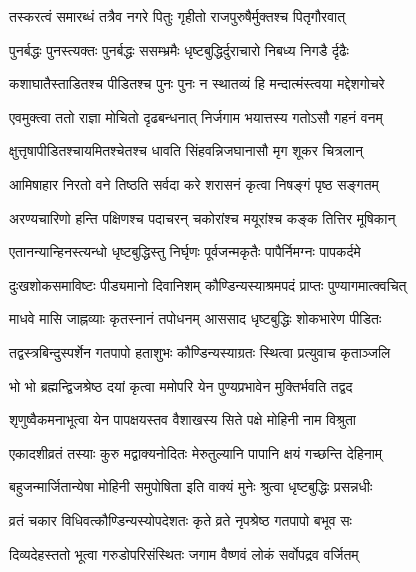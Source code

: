 \twolineshloka
{तस्करत्वं समारब्धं तत्रैव नगरे पितुः}
{गृहीतो राजपुरुषैर्मुक्तश्च पितृगौरवात्}%

\twolineshloka
{पुनर्बद्धः पुनस्त्यक्तः पुनर्बद्धः ससम्भ्रमैः}
{धृष्टबुद्धिर्दुराचारो निबध्य निगडै र्दृढैः}%

\twolineshloka
{कशाघातैस्ताडितश्च पीडितश्च पुनः पुनः}
{न स्थातव्यं हि मन्दात्मंस्त्वया मद्देशगोचरे}%

\twolineshloka
{एवमुक्त्वा ततो राज्ञा मोचितो दृढबन्धनात्}
{निर्जगाम भयात्तस्य गतोऽसौ गहनं वनम्}%

\twolineshloka
{क्षुत्तृषापीडितश्चायमितश्चेतश्च धावति}
{सिंहवन्निजघानासौ मृग शूकर चित्रलान्}%

\twolineshloka
{आमिषाहार निरतो वने तिष्ठति सर्वदा}
{करे शरासनं कृत्वा निषङ्गं पृष्ठ सङ्गतम्}%

\twolineshloka
{अरण्यचारिणो हन्ति पक्षिणश्च पदाचरन्}
{चकोरांश्च मयूरांश्च कङ्क तित्तिर मूषिकान्}%

\twolineshloka
{एतानन्यान्हिनस्त्यन्धो धृष्टबुद्धिस्तु निर्घृणः}
{पूर्वजन्मकृतैः पापैर्निमग्नः पापकर्दमे}%

\twolineshloka
{दुःखशोकसमाविष्टः पीड्यमानो दिवानिशम्}
{कौण्डिन्यस्याश्रमपदं प्राप्तः पुण्यागमात्क्वचित्}%

\twolineshloka
{माधवे मासि जाह्नव्याः कृतस्नानं तपोधनम्}
{आससाद धृष्टबुद्धिः शोकभारेण पीडितः}%

\twolineshloka
{तद्वस्त्रबिन्दुस्पर्शेन गतपापो हताशुभः}
{कौण्डिन्यस्याग्रतः स्थित्वा प्रत्युवाच कृताञ्जलि}%


\twolineshloka
{भो भो ब्रह्मन्द्विजश्रेष्ठ दयां कृत्वा ममोपरि}
{येन पुण्यप्रभावेन मुक्तिर्भवति तद्वद}%


\twolineshloka
{शृणुष्वैकमनाभूत्वा येन पापक्षयस्तव}
{वैशाखस्य सिते पक्षे मोहिनी नाम विश्रुता}%

\twolineshloka
{एकादशीव्रतं तस्याः कुरु मद्वाक्यनोदितः}
{मेरुतुल्यानि पापानि क्षयं गच्छन्ति देहिनाम्}%

\twolineshloka
{बहुजन्मार्जितान्येषा मोहिनी समुपोषिता}
{इति वाक्यं मुनेः श्रुत्वा धृष्टबुद्धिः प्रसन्नधीः}%

\twolineshloka
{व्रतं चकार विधिवत्कौण्डिन्यस्योपदेशतः}
{कृते व्रते नृपश्रेष्ठ गतपापो बभूव सः}%

\twolineshloka
{दिव्यदेहस्ततो भूत्वा गरुडोपरिसंस्थितः}
{जगाम वैष्णवं लोकं सर्वोपद्रव वर्जितम्}%

